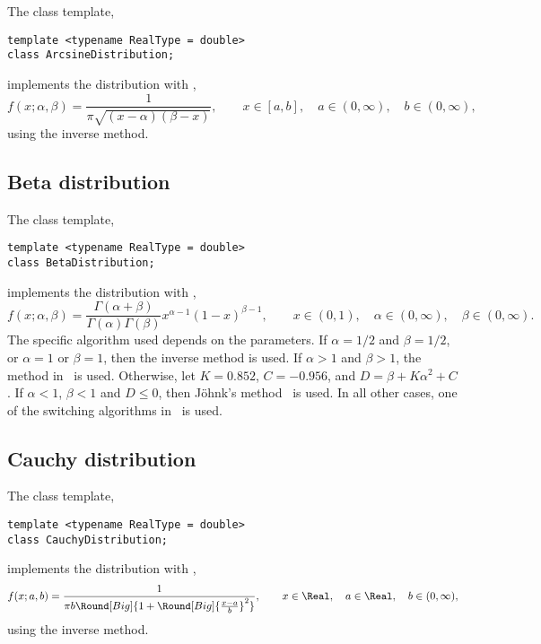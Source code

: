 The class template,
\begin{verbatim}
template <typename RealType = double>
class ArcsineDistribution;
\end{verbatim}
implements the distribution with \pdf,
\begin{equation*}
  f(x;\alpha,\beta) = \frac{1}{\pi\sqrt{(x - \alpha)(\beta - x)}},\qquad
  x \in [a, b],\quad a \in (0,\infty),\quad b \in (0,\infty),
\end{equation*}
using the inverse method.

\subsection{Beta distribution}
\label{sub:Beta distribution}

The class template,
\begin{verbatim}
template <typename RealType = double>
class BetaDistribution;
\end{verbatim}
implements the distribution with \pdf,
\begin{equation*}
  f(x;\alpha,\beta) =
  \frac{\Gamma(\alpha + \beta)}{\Gamma(\alpha)\Gamma(\beta)}
  x^{\alpha - 1}(1 - x)^{\beta - 1},\qquad
  x \in (0, 1),\quad \alpha \in (0,\infty),\quad \beta \in (0,\infty).
\end{equation*}
The specific algorithm used depends on the parameters. If $\alpha = 1/2$ and
$\beta = 1/2$, or $\alpha = 1$ or $\beta = 1$, then the inverse method is used.
If $\alpha > 1$ and $\beta > 1$, the method in~\cite{Cheng:1978jl} is used.
Otherwise, let $K = 0.852$, $C = -0.956$, and $D = \beta + K\alpha^2 + C$. If
$\alpha < 1$, $\beta < 1$ and $D \le 0$, then Jöhnk's
method~\cite[sec.~3.5]{Devroye:1986gi} is used. In all other cases, one of the
switching algorithms in~\cite{Atkinson:1979es} is used.

\subsection{Cauchy distribution}
\label{sub:Cauchy distribution}

The class template,
\begin{verbatim}
template <typename RealType = double>
class CauchyDistribution;
\end{verbatim}
implements the distribution with \pdf,
\begin{equation*}
  f(x;a,b) =
  \frac{1}{\pi b\Round[Big]{1 + \Round[Big]{\frac{x - a}{b}}^2}},\qquad
  x \in \Real,\quad a \in \Real,\quad b \in (0,\infty),
\end{equation*}
using the inverse method.


